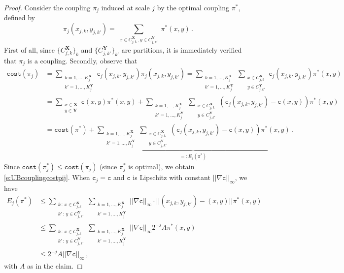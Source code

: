 \documentclass[twoside,11pt]{article}
\newcommand{\cost}[0]{\mathtt{c}}
\newcommand{\couplingcost}[0]{\mathtt{cost}}
\newcommand{\coupling}[0]{\pi}
\newcommand{\Xsp}{{\mathbf{X}}}
\newcommand{\Ysp}{{\mathbf{Y}}}
\begin{document}
\begin{proof}
Consider the coupling $\coupling_j$ induced at scale $j$ by the optimal
coupling $\coupling^*$, defined by 
\begin{equation*}
\coupling_j(x_{j,k},y_{j,k'}) = \sum_{\substack{x\in C^{{\Xsp}}_{j,k}\,,
 y\in C^{{\Ysp}}_{j,k'}}} \coupling^*(x,y)\,.
\end{equation*}
First of all, since $\{C^{{\Xsp}}_{j,k}\}_k$ and $\{C^{{\Ysp}}_{j,k'}\}_{k'}$
are partitions, it is immediately verified that $\coupling_j$ is a coupling. Secondly,
observe that 
\begin{align*}
\couplingcost(\coupling_j)
&=\sum_{\substack{k=1,\dots,K_j^{{\Xsp}}\\ k'=1,\dots,K_j^{{\Ysp}}}} 
  \cost_j(x_{j,k}, y_{j,k'}) \coupling_j(x_{j,k}, y_{j,k'})
=\sum_{\substack{k=1,\dots,K_j^{{\Xsp}}\\ k'=1,\dots,K_j^{{\Ysp}}}} 
  \sum_{\substack{x\in C^{{\Xsp}}_{j,k}\\ y\in C^{{\Ysp}}_{j,k'}}} 
  \cost_j(x_{j,k}, y_{j,k'}) \coupling^*(x,y)\\
&=\sum_{\substack{x\in{\Xsp}\\ y\in{\Ysp}}} \cost(x,y)\coupling^*(x,y)+
  \sum_{\substack{k=1,\dots,K_j^{{\Xsp}}\\ k'=1,\dots,K_j^{{\Ysp}}}} 
  \sum_{\substack{x\in C^{{\Xsp}}_{j,k}\\ y\in C^{{\Ysp}}_{j,k'}}}
  \left(\cost_j(x_{j,k},y_{j,k'})-\cost(x,y)\right) \coupling^*(x,y)\\
&= \couplingcost(\coupling^*) + \underbrace{ \sum_{\substack{k=1,\dots,K_j^{{\Xsp}}\\
   k'=1,\dots,K_j^{{\Ysp}}}} \sum_{\substack{x\in C^{{\Xsp}}_{j,k}\\ y\in C^{{\Ysp}}_{j,k'}}}
  \left(\cost_j(x_{j,k},y_{j,k'})-\cost(x,y)\right) \coupling^*(x,y)}_{=:E_j(\coupling^*)}\,.
\end{align*}
Since $\couplingcost(\coupling^*_j)\le\couplingcost(\coupling_j)$ (since
$\coupling^*_j$ is optimal), we obtain \eqref{e:UBcouplingcostpij}.
When $\cost_j=\cost$ and $\cost$ is Lipschitz with constant $||\nabla\cost||_\infty$, we have
\begin{align*}
E_j(\coupling^*)
&\le \sum_{\substack{k\,:\,x\in C^{{\Xsp}}_{j,k}\\ 
  k'\,:\,y\in C^{{\Ysp}}_{j,k'}}} \sum_{\substack{k=1,\dots,K_j^{{\Xsp}}\\ 
  k'=1,\dots,K_j^{{\Ysp}}}}||\nabla\cost||_\infty\cdot ||(x_{j,k},y_{j,k'})-(x,y)||\coupling^*(x,y)\\
&\le \sum_{\substack{k\,:\,x\in C^{{\Xsp}}_{j,k}\\ 
  k'\,:\,y\in C^{{\Ysp}}_{j,k'}}} \sum_{\substack{k=1,\dots,K_j^{{\Xsp}}\\ 
  k'=1,\dots,K_j^{{\Ysp}}}}||\nabla\cost||_\infty 2^{-j}A\coupling^*(x,y)\\
&\le 2^{-j}A||\nabla\cost||_\infty \,,
\end{align*}
with $A$ as in the claim.
\end{proof}
\end{document}
